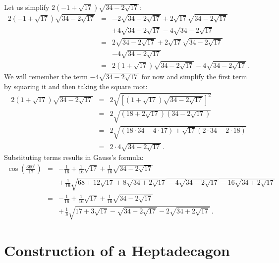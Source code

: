 Let us simplify $2(-1+\sqrt{17})\sqrt{34-2\sqrt{17}}$:
\begin{eqnarray*}
2(-1+\sqrt{17})\sqrt{34-2\sqrt{17}} &=&
-2\sqrt{34-2\sqrt{17}} +2\sqrt{17}\sqrt{34-2\sqrt{17}}\\
&&+4\sqrt{34-2\sqrt{17}}-4\sqrt{34-2\sqrt{17}}\\
&=&
2\sqrt{34-2\sqrt{17}} +2\sqrt{17}\sqrt{34-2\sqrt{17}}\\
&&-4\sqrt{34-2\sqrt{17}}\\
&=&2(1+\sqrt{17})\sqrt{34-2\sqrt{17}}-4\sqrt{34-2\sqrt{17}}\,.
\end{eqnarray*}
We will remember the term $-4\sqrt{34-2\sqrt{17}}$ for now and simplify the first term by squaring it and then taking the square root:
\begin{eqnarray*}
2(1+\sqrt{17})\sqrt{34-2\sqrt{17}}&=&
2\sqrt{\left[(1+\sqrt{17})\sqrt{34-2\sqrt{17}}\right]^2}\\
&=&2\sqrt{(18+2\sqrt{17})(34-2\sqrt{17})}\\
&=&2\sqrt{(18\cdot 34-4\cdot17)+\sqrt{17}(2\cdot 34 - 2\cdot 18)}\\
&=&2\cdot 4\sqrt{34+2\sqrt{17}}\,.
\end{eqnarray*}
Substituting terms results in Gauss's formula:
\begin{eqnarray*}
\cos\left(\frac{360^\circ}{17}\right) &=&
-\frac{1}{16}+\frac{1}{16}\sqrt{17} + 
     \frac{1}{16}\sqrt{34-2\sqrt{17}} \\
    &&
     +\,\frac{1}{16}\sqrt{
     68+12\sqrt{17} + 
     8\sqrt{34+2\sqrt{17}}-4\sqrt{34-2\sqrt{17}}
   -16
     \sqrt{34+2\sqrt{17}}
   }\\
&=&-\frac{1}{16}+\frac{1}{16}\sqrt{17} + 
     \frac{1}{16}\sqrt{34-2\sqrt{17}}\\
&&+\,\frac{1}{8}\sqrt{
     17+3\sqrt{17} - 
     \sqrt{34-2\sqrt{17}}
   -2
     \sqrt{34+2\sqrt{17}}
   }\,.
\end{eqnarray*}

\section{Construction of a Heptadecagon}\label{s.construction}

